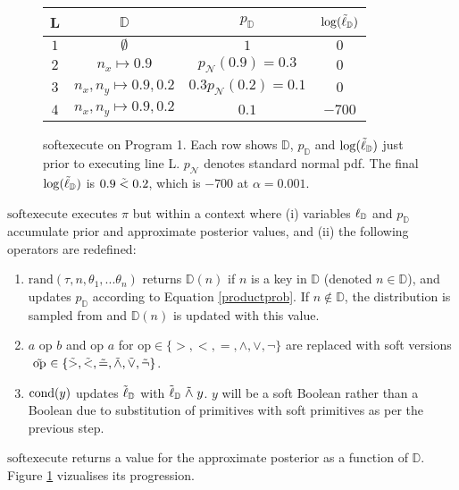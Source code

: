 \begin{figure}
\begin{center}
  \begin{tabular}{ |c|c|c|c| } 
   \hline
   L & $\mathbb{D}$ &  $p_\mathbb{D}$ & $\log(\tilde{\ell}_\mathbb{D})$ \\
   \hline
   $1$ & $\emptyset$ & $1$ & $0$ \\ 
   $2$ & $ n_x \mapsto 0.9$ & $p_\mathcal{N}(0.9) = 0.3$ & $0$ \\ 
   $3$ &  $n_x, n_y \mapsto 0.9, 0.2$ & $0.3 p_\mathcal{N}(0.2) = 0.1$ & $0$ \\
   $4$ & $n_x, n_y \mapsto 0.9, 0.2$ & $0.1$ & $-700$ \\ 
   \hline
  \end{tabular}
\end{center}
\caption{softexecute on Program 1.  Each row shows $\mathbb{D}$,  $p_\mathbb{D}$ and $\log(\tilde{\ell}_\mathbb{D})$ just prior to executing line L.  $p_\mathcal{N}$ denotes standard normal pdf.  The final $\log(\tilde{\ell}_\mathbb{D})$ is $0.9 \mathrel{\tilde{<}} 0.2$, which is $-700$ at $\alpha = 0.001$.}
\label{table:sofex}
\end{figure}


$\textrm{softexecute}$ executes $\pi$ but within a context where (i) variables $\operatorname{\ell}_\mathbb{D}$ and $p_\mathbb{D}$ accumulate prior and approximate posterior values, and (ii) the following operators are redefined:

\begin{enumerate}
  \item $\textrm{rand}(\tau, n, \theta_1, ...\theta_n)$ returns $\mathbb{D}(n)$ if $n$ is a key in $\mathbb{D}$ (denoted $n \in \mathbb{D}$), and updates $p_\mathbb{D}$ according to Equation \ref{productprob}. If $n \notin \mathbb{D}$, the distribution is sampled from and $\mathbb{D}(n)$ is updated with this value.  
  \item $a \text{ op } b$ and $\textrm{op } a$ for $\textrm{op} \in \{>, <, =, \land, \lor, \neg\}$ are replaced with soft versions $\mathrel{\tilde{\textrm{ op }}} \in \{\mathrel{\tilde{>}}, \mathrel{\tilde{<}}, \mathrel{\tilde{=}}, \mathrel{\tilde{\land}}, \mathrel{\tilde{\lor}}, \mathrel{\tilde{\neg}}\}$.
  \item $\operatorname{cond}(y)$ updates $\tilde{\operatorname{\ell}}_\mathbb{D}$ with $\tilde{\operatorname{\ell}}_\mathbb{D} \mathrel{\tilde{\land}} y$. $y$ will be a soft Boolean rather than a Boolean due to substitution of primitives with soft primitives as per the previous step.
\end{enumerate}

$\textrm{softexecute}$ returns a value for the approximate posterior as a function of $\mathbb{D}$.  Figure \ref{table:sofex} vizualises its progression.

